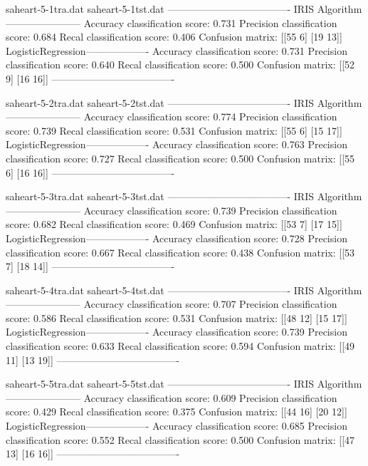 \documentclass{article}
\begin{document}
\twocolumn
\begin{Output}
saheart-5-1tra.dat saheart-5-1tst.dat
-------------------------------------
IRIS Algorithm-----------------------
Accuracy classification score:  0.731
Precision classification score: 0.684
Recal classification score:     0.406
Confusion matrix:
[[55  6]
 [19 13]]
LogisticRegression-------------------
Accuracy classification score:  0.731
Precision classification score: 0.640
Recal classification score:     0.500
Confusion matrix:
[[52  9]
 [16 16]]
-------------------------------------



saheart-5-2tra.dat saheart-5-2tst.dat
-------------------------------------
IRIS Algorithm-----------------------
Accuracy classification score:  0.774
Precision classification score: 0.739
Recal classification score:     0.531
Confusion matrix:
[[55  6]
 [15 17]]
LogisticRegression-------------------
Accuracy classification score:  0.763
Precision classification score: 0.727
Recal classification score:     0.500
Confusion matrix:
[[55  6]
 [16 16]]
-------------------------------------



saheart-5-3tra.dat saheart-5-3tst.dat
-------------------------------------
IRIS Algorithm-----------------------
Accuracy classification score:  0.739
Precision classification score: 0.682
Recal classification score:     0.469
Confusion matrix:
[[53  7]
 [17 15]]
LogisticRegression-------------------
Accuracy classification score:  0.728
Precision classification score: 0.667
Recal classification score:     0.438
Confusion matrix:
[[53  7]
 [18 14]]
-------------------------------------



saheart-5-4tra.dat saheart-5-4tst.dat
-------------------------------------
IRIS Algorithm-----------------------
Accuracy classification score:  0.707
Precision classification score: 0.586
Recal classification score:     0.531
Confusion matrix:
[[48 12]
 [15 17]]
LogisticRegression-------------------
Accuracy classification score:  0.739
Precision classification score: 0.633
Recal classification score:     0.594
Confusion matrix:
[[49 11]
 [13 19]]
-------------------------------------



saheart-5-5tra.dat saheart-5-5tst.dat
-------------------------------------
IRIS Algorithm-----------------------
Accuracy classification score:  0.609
Precision classification score: 0.429
Recal classification score:     0.375
Confusion matrix:
[[44 16]
 [20 12]]
LogisticRegression-------------------
Accuracy classification score:  0.685
Precision classification score: 0.552
Recal classification score:     0.500
Confusion matrix:
[[47 13]
 [16 16]]
-------------------------------------
\end{Output}
\end{document}
